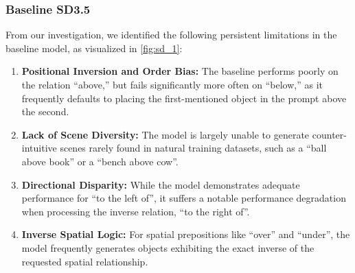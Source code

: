 
\subsubsection{Baseline SD3.5}
From our investigation, we identified the following persistent limitations in the baseline model, as visualized in \cref{fig:sd_1}:
\begin{enumerate}
    \item \textbf{Positional Inversion and Order Bias:} The baseline performs poorly on the relation ``above,'' but fails significantly more often on ``below,'' as it frequently defaults to placing the first-mentioned object in the prompt above the second.
    \item \textbf{Lack of Scene Diversity:} The model is largely unable to generate counter-intuitive scenes rarely found in natural training datasets, such as a ``ball above book'' or a ``bench above cow''.
    \item \textbf{Directional Disparity:} While the model demonstrates adequate performance for ``to the left of'', it suffers a notable performance degradation when processing the inverse relation, ``to the right of''.
    \item \textbf{Inverse Spatial Logic:} For spatial prepositions like ``over'' and ``under'', the model frequently generates objects exhibiting the exact inverse of the requested spatial relationship.
\end{enumerate}

